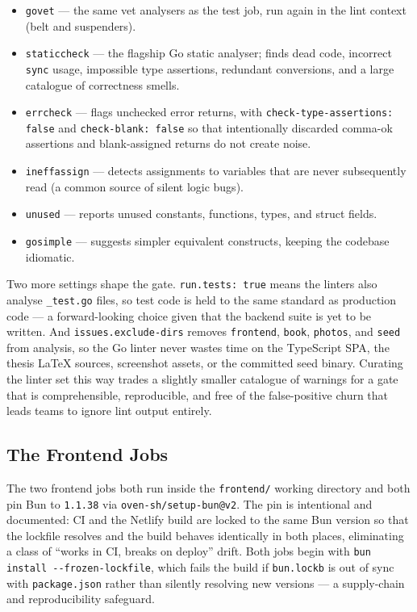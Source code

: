 \begin{itemize}
  \item \texttt{govet} --- the same vet analysers as the test job, run
  again in the lint context (belt and suspenders).
  \item \texttt{staticcheck} --- the flagship Go static analyser; finds
  dead code, incorrect \texttt{sync} usage, impossible type assertions,
  redundant conversions, and a large catalogue of correctness smells.
  \item \texttt{errcheck} --- flags unchecked error returns, with
  \texttt{check-type-assertions: false} and \texttt{check-blank: false}
  so that intentionally discarded comma-ok assertions and
  blank-assigned returns do not create noise.
  \item \texttt{ineffassign} --- detects assignments to variables that
  are never subsequently read (a common source of silent logic bugs).
  \item \texttt{unused} --- reports unused constants, functions, types,
  and struct fields.
  \item \texttt{gosimple} --- suggests simpler equivalent constructs,
  keeping the codebase idiomatic.
\end{itemize}

Two more settings shape the gate. \texttt{run.tests: true} means the
linters also analyse \texttt{\_test.go} files, so test code is held to the
same standard as production code --- a forward-looking choice given that
the backend suite is yet to be written. And \texttt{issues.exclude-dirs}
removes \texttt{frontend}, \texttt{book}, \texttt{photos}, and
\texttt{seed} from analysis, so the Go linter never wastes time on the
TypeScript SPA, the thesis LaTeX sources, screenshot assets, or the
committed seed binary. Curating the linter set this way trades a slightly
smaller catalogue of warnings for a gate that is comprehensible,
reproducible, and free of the false-positive churn that leads teams to
ignore lint output entirely.

\subsection{The Frontend Jobs}

The two frontend jobs both run inside the \texttt{frontend/} working
directory and both pin Bun to \texttt{1.1.38} via
\texttt{oven-sh/setup-bun@v2}. The pin is intentional and documented:
CI and the Netlify build are locked to the same Bun version so that the
lockfile resolves and the build behaves identically in both places,
eliminating a class of ``works in CI, breaks on deploy'' drift. Both jobs
begin with \texttt{bun install -{}-frozen-lockfile}, which fails the
build if \texttt{bun.lockb} is out of sync with \texttt{package.json}
rather than silently resolving new versions --- a supply-chain and
reproducibility safeguard.


